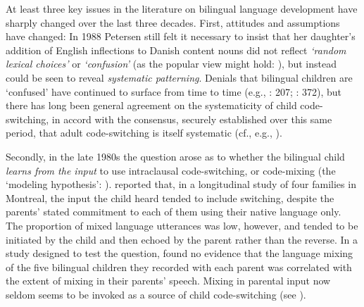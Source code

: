 \documentclass[output=paper]{langscibook}
\begin{document}
At least three key issues in the literature on bilingual language development have sharply changed over the last three decades. First, attitudes and assumptions have changed:  {In 1988} Petersen still felt it necessary to insist that her daughter’s addition of English inflections to Danish content nouns did not reflect \textit{‘random lexical choices’} or \textit{‘confusion’} (as the popular view might hold: \citealt{Goodz1989}), but instead could be seen to reveal \textit{systematic patterning}. Denials that bilingual children are ‘confused’ have continued to surface from time to time (e.g., \citealt{YipMatthews2000}: 207; \citealt{ParadisNavarro2003}: 372), but there has long been general agreement on the systematicity of child code-switching, in accord with the consensus, securely established over this same period, that adult code-switching is itself systematic (cf., e.g., \citealt{Kroll2005,Deuchar2012,Deuchar2020,ValdesKroffDussias2023}).

Secondly, in the late 1980s the question arose as to whether the bilingual child \textit{learns from the input} to use intraclausal code-switching, or code-mixing (the ‘modeling hypothesis’: \citealt{ComeauEtAl2003}). \citet{Goodz1989} reported that, in a longitudinal study of four families in Montreal, the input the child heard tended to include switching, despite the parents’ stated commitment to each of them using their native language only. The proportion of mixed language utterances was low, however, and tended to be initiated by the child and then echoed by the parent rather than the reverse. In a study designed to test the question, \citet{GeneseeEtAl1995} found no evidence that the language mixing of the five bilingual children they recorded with each parent was correlated with the extent of mixing in their parents’ speech. Mixing in parental input now seldom seems to be invoked as a source of child code-switching (see \citealt{MengMiyamoto2012,TullochHoff2022}).
\end{document}
